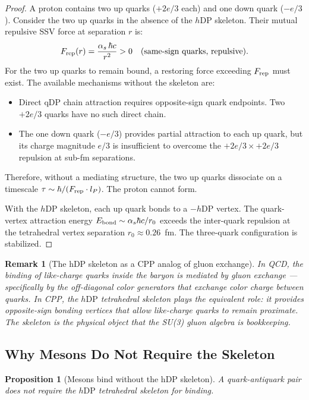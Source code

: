 \documentclass[12pt]{article}
\newtheorem{proposition}[theorem]{Proposition}
\newtheorem{remark}[theorem]{Remark}
\newcommand{\hDP}{h\mathrm{DP}}
\newcommand{\as}{\alpha_s}
\begin{document}
\begin{proof}
A proton contains two up quarks ($+2e/3$ each) and one down quark
($-e/3$).  Consider the two up quarks in the absence of the $\hDP$
skeleton.  Their mutual repulsive SSV force at separation $r$ is:
\begin{equation}
F_{\rm rep}(r) = \frac{\as\,\hbar c}{r^2} > 0 \quad
\text{(same-sign quarks, repulsive)}.
\label{eq:rep}
\end{equation}
For the two up quarks to remain bound, a restoring force exceeding
$F_{\rm rep}$ must exist.  The available mechanisms without the
skeleton are:
\begin{itemize}[noitemsep]
\item Direct qDP chain attraction requires opposite-sign quark
  endpoints.  Two $+2e/3$ quarks have no such direct chain.
\item The one down quark ($-e/3$) provides partial attraction to
  each up quark, but its charge magnitude $e/3$ is insufficient
  to overcome the $+2e/3 \times +2e/3$ repulsion at sub-fm
  separations.
\end{itemize}
Therefore, without a mediating structure, the two up quarks
dissociate on a timescale $\tau \sim \hbar/(F_{\rm rep} \cdot l_P)$.
The proton cannot form.

With the $\hDP$ skeleton, each up quark bonds to a $-\hDP$ vertex.
The quark-vertex attraction energy $E_{\rm bond} \sim \as\hbar c/r_0$
exceeds the inter-quark repulsion at the tetrahedral vertex separation
$r_0 \approx 0.26$~fm.  The three-quark configuration is stabilized.
\end{proof}

\begin{remark}[The hDP skeleton as a CPP analog of gluon exchange]
In QCD, the binding of like-charge quarks inside the baryon is
mediated by gluon exchange --- specifically by the off-diagonal
color generators that exchange color charge between quarks.  In CPP,
the $\hDP$ tetrahedral skeleton plays the equivalent role: it
provides opposite-sign bonding vertices that allow like-charge quarks
to remain proximate.  The skeleton is the \emph{physical object}
that the SU(3) gluon algebra is bookkeeping.
\end{remark}

\subsection{Why Mesons Do Not Require the Skeleton}

\begin{proposition}[Mesons bind without the hDP skeleton]
\label{prop:meson_no_skeleton}
A quark-antiquark pair does not require the $\hDP$ tetrahedral
skeleton for binding.
\end{proposition}
\end{document}
